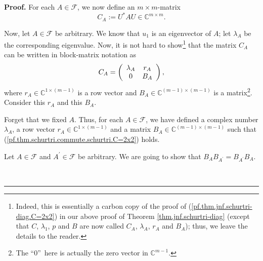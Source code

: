 \documentclass[numbers=enddot,12pt,final,onecolumn,notitlepage]{scrartcl}%
\numberwithin{exer}{subsection}
\theoremstyle{definition}
\newenvironment{proof}[1][Proof]{\noindent\textbf{#1.} }{\ \rule{0.5em}{0.5em}}
\begin{document}
\begin{proof}
For each $A\in\mathcal{F}$, we now define an $m\times m$-matrix%
\[
C_{A}:=U^{\ast}AU\in\mathbb{C}^{m\times m}.
\]


Now, let $A\in\mathcal{F}$ be arbitrary. We know that $u_{1}$ is an
eigenvector of $A$; let $\lambda_{A}$ be the corresponding eigenvalue. Now, it
is not hard to show\footnote{Indeed, this is essentially a carbon copy of the
proof of (\ref{pf.thm.jnf.schurtri-diag.C=2x2}) in our above proof of Theorem
\ref{thm.jnf.schurtri-diag} (except that $C$, $\lambda_{1}$, $p$ and $B$ are
now called $C_{A}$, $\lambda_{A}$, $r_{A}$ and $B_{A}$); thus, we leave the
details to the reader.} that the matrix $C_{A}$ can be written in block-matrix
notation as%
\begin{equation}
C_{A}=\left(
\begin{array}
[c]{cc}%
\lambda_{A} & r_{A}\\
0 & B_{A}%
\end{array}
\right)  , \label{pf.thm.schurtri.commute.schurtri.C=2x2}%
\end{equation}
where $r_{A}\in\mathbb{C}^{1\times\left(  m-1\right)  }$ is a row vector and
$B_{A}\in\mathbb{C}^{\left(  m-1\right)  \times\left(  m-1\right)  }$ is a
matrix\footnote{The \textquotedblleft$0$\textquotedblright\ here is actually
the zero vector in $\mathbb{C}^{m-1}$.}. Consider this $r_{A}$ and this
$B_{A}$.

Forget that we fixed $A$. Thus, for each $A\in\mathcal{F}$, we have defined a
complex number $\lambda_{A}$, a row vector $r_{A}\in\mathbb{C}^{1\times\left(
m-1\right)  }$ and a matrix $B_{A}\in\mathbb{C}^{\left(  m-1\right)
\times\left(  m-1\right)  }$ such that
(\ref{pf.thm.schurtri.commute.schurtri.C=2x2}) holds.

Let $A\in\mathcal{F}$ and $A^{\prime}\in\mathcal{F}$ be arbitrary. We are
going to show that $B_{A}B_{A^{\prime}}=B_{A^{\prime}}B_{A}$.


\end{proof}
\end{document}
